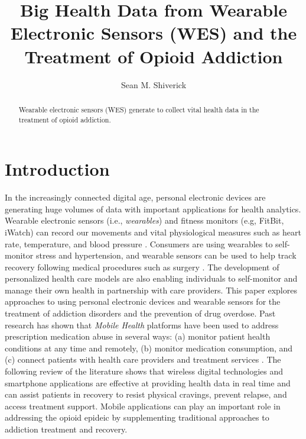 \documentclass[sigconf]{acmart}
\begin{document}
\title{Big Health Data from Wearable Electronic Sensors (WES) and 
the Treatment of Opioid Addiction}

\author{Sean M. Shiverick}


\begin{abstract}
Wearable electronic sensors (WES) generate to collect
vital health data in the treatment of opioid addiction. 
\end{abstract}


\maketitle


\section{Introduction}

In the increasingly connected digital age, personal electronic devices are 
generating huge volumes of data with important applications for health analytics. 
Wearable electronic sensors (i.e., \emph{wearables}) and fitness monitors 
(e.g, FitBit, iWatch) can record our movements and vital physiological measures 
such as heart rate, temperature, and blood pressure \cite{metcalf16}. Consumers 
are using wearables to self-monitor stress and hypertension, and wearable sensors 
can be used to help track recovery following medical procedures such as surgery 
\cite{atallah11}. The development of personalized health care models are also 
enabling individuals to self-monitor and manage their own health in partnership 
with care providers. This paper explores approaches to using personal electronic 
devices and wearable sensors for the treatment of addiction disorders and the 
prevention of drug overdose. Past research has shown that \emph{Mobile Health} 
platforms have been used to address prescription medication abuse in several ways: 
(a) monitor patient health conditions at any time and remotely, (b) monitor 
medication consumption, and (c) connect patients with health care providers and 
treatment services \cite{Varshney14}. The following review of the literature shows 
that wireless digital technologies and smartphone applications are effective 
at providing health data in real time and can assist patients in recovery to 
resist physical cravings, prevent relapse, and access treatment support. 
Mobile applications can play an important role in addressing the opioid epideic 
by supplementing traditional approaches to addiction treatment and recovery. 
\end{document}
